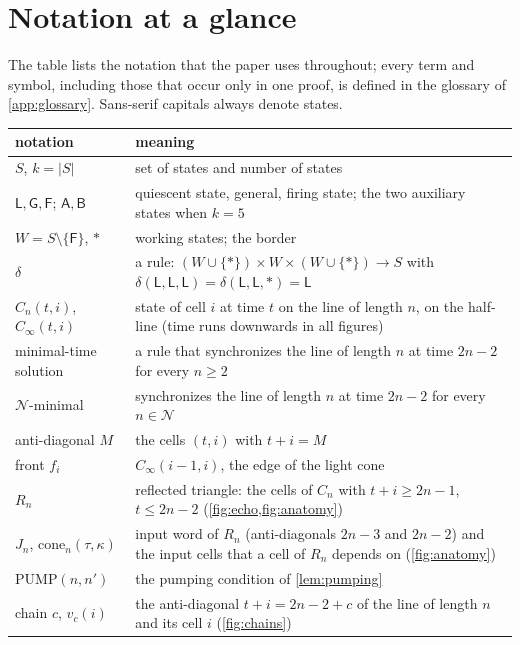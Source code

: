 \section*{Notation at a glance}\label{sec:notation}

The table lists the notation that the paper uses throughout; every term
and symbol, including those that occur only in one proof, is defined in
the glossary of \cref{app:glossary}. Sans-serif capitals always denote
states.

\begin{center}\small
\begin{tabular}{@{}p{}p{}@{}}
\toprule
notation & meaning\\
\midrule
$S$, $k=|S|$ & set of states and number of states\\
$\mathsf L,\mathsf G,\mathsf F$; $\mathsf A,\mathsf B$ & quiescent state, general, firing state; the two
  auxiliary states when $k=5$\\
$W=S\setminus\{\mathsf F\}$, $\ast$ & working states; the border\\
$\delta$ & a rule: $(W\cup\{\ast\})\times W\times(W\cup\{\ast\})\to S$ with
  $\delta(\mathsf L,\mathsf L,\mathsf L)=\delta(\mathsf L,\mathsf L,\ast)=\mathsf L$\\
$C_n(t,i)$, $C_\infty(t,i)$ & state of cell $i$ at time $t$ on the line of length $n$, on the
  half-line (time runs downwards in all figures)\\
minimal-time solution & a rule that synchronizes the line of length $n$ at time $2n-2$ for every $n\ge2$\\
$\mathcal N$-minimal & synchronizes the line of length $n$ at time $2n-2$ for every $n\in\mathcal N$\\
anti-diagonal $M$ & the cells $(t,i)$ with $t+i=M$\\
front $f_i$ & $C_\infty(i-1,i)$, the edge of the light cone\\
$R_n$ & reflected triangle: the cells of $C_n$ with $t+i\ge2n-1$, $t\le2n-2$ (\cref{fig:echo,fig:anatomy})\\
$J_n$, $\mathrm{cone}_n(\tau,\kappa)$ & input word of $R_n$ (anti-diagonals $2n-3$ and $2n-2$) and
  the input cells that a cell of $R_n$ depends on (\cref{fig:anatomy})\\
$\mathrm{PUMP}(n,n')$ & the pumping condition of \cref{lem:pumping}\\
chain $c$, $v_c(i)$ & the anti-diagonal $t+i=2n-2+c$ of the line of length $n$ and its cell $i$ (\cref{fig:chains})\\

\end{tabular}
\end{center}
